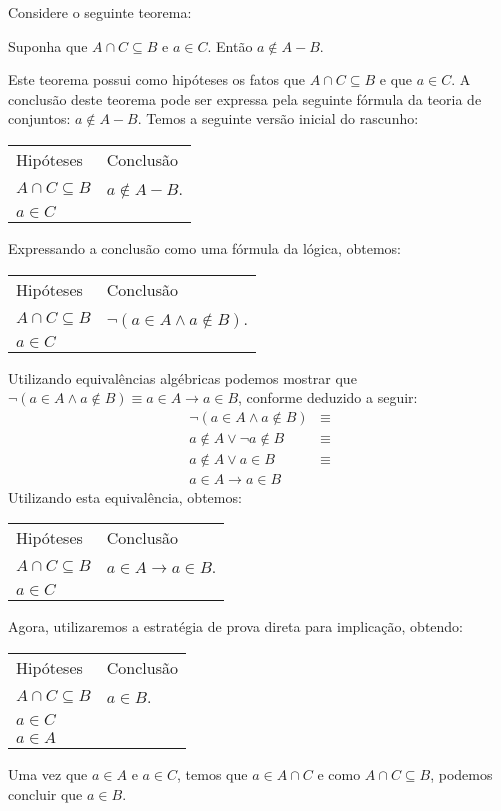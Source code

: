 \begin{Example}
Considere o seguinte teorema:
\begin{flushleft}
Suponha que $A\cap C\subseteq B$ e $a \in C$. Então $a\not\in A - B$.
\end{flushleft}
Este teorema possui como hipóteses os fatos que $A\cap C\subseteq B$ e
que $a\in C$. A  conclusão deste teorema pode ser expressa pela
seguinte fórmula da teoria de conjuntos: $a\not\in A - B$. Temos a
seguinte versão inicial do rascunho:
\begin{flushleft}
\begin{tabular}{ll}
Hipóteses & Conclusão \\
$A\cap C \subseteq B$ & $a\not\in A - B$.\\
$a\in C$ &
\end{tabular}
\end{flushleft}
Expressando a conclusão como uma fórmula da lógica, obtemos:
\begin{flushleft}
\begin{tabular}{ll}
Hipóteses & Conclusão \\
$A\cap C \subseteq B$ & $\neg (a\in A \land a \not\in B)$.\\
$a\in C$ &
\end{tabular}
\end{flushleft}
Utilizando equivalências algébricas podemos mostrar que $\neg (a\in A
\land a \not\in B) \equiv a\in A \to a \in B$, conforme deduzido a
seguir:
\[
\begin{array}{lc}
\neg (a\in A \land a \not\in B) & \equiv \\
a \not\in A \lor \neg a \not\in B & \equiv \\
a \not\in A \lor a \in B & \equiv \\
a \in A \to a \in B
\end{array}
\]
Utilizando esta equivalência, obtemos:
\begin{flushleft}
\begin{tabular}{ll}
Hipóteses & Conclusão \\
$A\cap C \subseteq B$ & $a\in A \to a\in B$.\\
$a\in C$ &
\end{tabular}
\end{flushleft}
Agora, utilizaremos a estratégia de prova direta para implicação,
obtendo:
\begin{flushleft}
\begin{tabular}{ll}
Hipóteses & Conclusão \\
$A\cap C \subseteq B$ & $a\in B$.\\
$a\in C$ & \\
$a\in A$
\end{tabular}
\end{flushleft}
Uma vez que $a \in A$ e $a\in C$, temos que $a\in A \cap C$ e como $A
\cap C \subseteq B$, podemos concluir que $a\in B$.


\end{Example}
